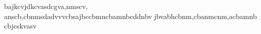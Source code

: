 bajkcvjdkcvasdcgva,nmscv, anscb,cbnmsdadvvvcbsajbccbmncbamnbcddnbvjbvabhcbnm,cbanmcnm,acbamnbcbjcskvasv
